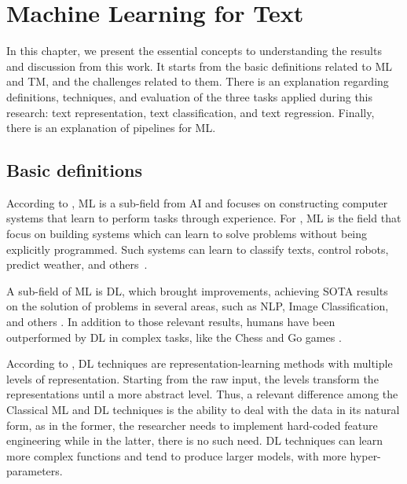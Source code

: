 \chapter{Machine Learning for Text}\label{cap:ml_text}

In this chapter, we present the essential concepts  to understanding the results and discussion from this work. It starts from the basic definitions related to \gls{ML} and \gls{TM},  and the challenges related to them. There is an explanation regarding definitions, techniques, and evaluation of the three tasks applied during this research: text representation, text classification, and text regression. 
Finally, there is an explanation of pipelines for \gls{ML}.

\section{Basic definitions} \label{sec:basic_definitions}


According to \textcite{Mitchell1997}, \gls{ML} is a sub-field from \gls{AI} and focuses on constructing computer systems that learn to perform tasks through experience. For \textcite{Samuel1959}, \gls{ML} is the field that focus on building systems which can learn to solve problems without being explicitly programmed. Such systems can learn to classify texts, control robots, predict weather, and others~\cite{Sebastiani2002, Kober2013, Shi2015}.
 
A sub-field of \gls{ML} is \gls{DL}, which brought improvements, achieving \gls{SOTA} results on the solution of problems in several areas, such as \gls{NLP}, Image Classification, and others \cite{Brown2020, Tan2021, Sengupta2020}. In addition to those relevant results, humans have been outperformed by \gls{DL} in complex tasks, like the Chess and Go games \cite{Silver2017}. 

According to \textcite{Lecun2015}, \gls{DL} techniques are representation-learning methods with multiple levels of representation. Starting from the raw input, the levels transform the representations until a more abstract level. 
Thus, a relevant difference among  the Classical \gls{ML} and \gls{DL} techniques is the ability to deal with the data in its natural form, as in the former, the researcher needs to implement hard-coded feature engineering while in the latter, there is no such need. \gls{DL} techniques can learn more complex functions and tend to produce larger models, with more hyper-parameters.


